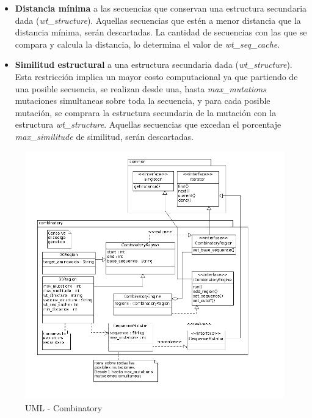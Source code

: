   \begin{itemize}
   \item \textbf{Distancia m\'inima} a las secuencias que conservan una
estructura secundaria dada (\textit{wt\_structure}). Aquellas secuencias que
est\'en a menor distancia que la distancia m\'inima, ser\'an descartadas. La
cantidad de secuencias con las que se compara y calcula la distancia, lo
determina el valor de \textit{wt\_seq\_cache}.
  
  \item \textbf{Similitud estructural} a una estructura secundaria dada
(\textit{wt\_structure}). Esta restricci\'on implica un mayor costo
computacional ya que partiendo de una posible secuencia, se realizan desde una,
hasta \textit{max\_mutations} mutaciones simultaneas sobre toda la secuencia, y
para cada posible mutaci\'on, se comprara la estructura secundaria de la
mutaci\'on con la estructura \textit{wt\_structure}. Aquellas secuencias que
excedan el porcentaje \textit{max\_similitude} de similitud, ser\'an
descartadas.
  \end{itemize}

   
    \begin{figure}
      \centering
      \includegraphics[scale=0.5]{lld-combinatory.png}  
      \caption{UML - Combinatory}
      \label{uml:lld-combinatory}
    \end{figure}

